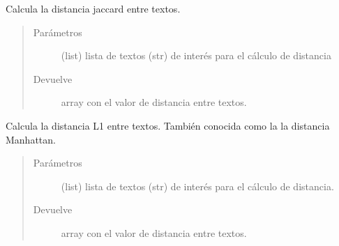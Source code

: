 \documentclass[letterpaper,10pt,openany,spanish]{sphinxmanual}
\begin{document}
\begin{fulllineitems}
\begin{fulllineitems}
\end{fulllineitems}


\begin{fulllineitems}
\label{\detokenize{funciones/comparacion:comparacion.Distancia.jaccard}}
Calcula la distancia jaccard entre textos.
\begin{quote}\begin{description}
\item[{Parámetros}] \leavevmode
{} \textendash{} (list) lista de textos (str) de interés para el 
cálculo de distancia

\item[{Devuelve}] \leavevmode
array con el valor de distancia entre textos.

\end{description}\end{quote}

\end{fulllineitems}


\begin{fulllineitems}
\label{\detokenize{funciones/comparacion:comparacion.Distancia.l1}}
Calcula la distancia L1 entre textos. También conocida como la 
la distancia Manhattan.
\begin{quote}\begin{description}
\item[{Parámetros}] \leavevmode
{} \textendash{} (list) lista de textos (str) de interés para el 
cálculo de distancia.

\item[{Devuelve}] \leavevmode
array con el valor de distancia entre textos.

\end{description}\end{quote}

\end{fulllineitems}



\end{fulllineitems}
\end{document}
